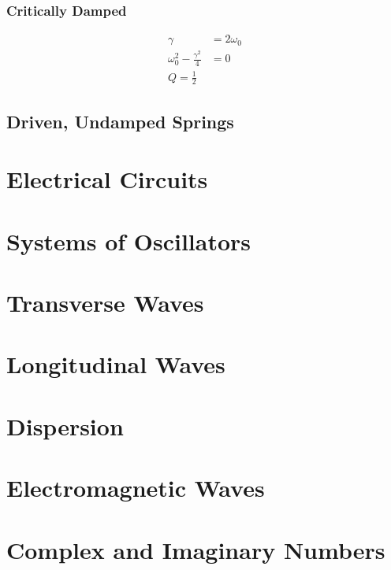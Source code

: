 \documentclass[a4paper, titlepage]{book}
\begin{document}
\subsection{Critically Damped}

\begin{equation}
    \begin{aligned}
        \gamma                          &= 2 \omega_0 \\
        \omega_0^2 - \frac{\gamma^2}{4} &= 0 \\
        Q = \frac{1}{2}
    \end{aligned}
\end{equation}


\section{Driven, Undamped Springs}


\chapter{Electrical Circuits}


\chapter{Systems of Oscillators}


\chapter{Transverse Waves}


\chapter{Longitudinal Waves}


\chapter{Dispersion}


\chapter{Electromagnetic Waves}


\appendix

\chapter{Complex and Imaginary Numbers} \label{ch:complex-and-imaginary-numbers}
\end{document}
